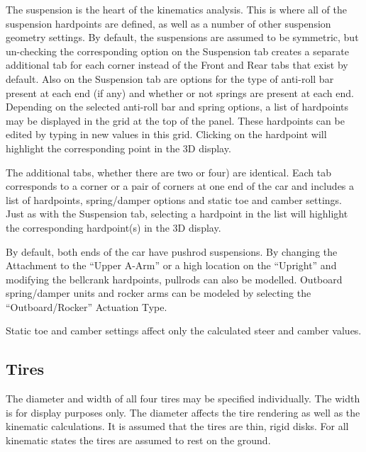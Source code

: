 The suspension is the heart of the kinematics analysis.  This is where all of the suspension hardpoints are defined, as well as a number of other suspension geometry settings.  By default, the suspensions are assumed to be symmetric, but un-checking the corresponding option on the Suspension tab creates a separate additional tab for each corner instead of the Front and Rear tabs that exist by default.  Also on the Suspension tab are options for the type of anti-roll bar present at each end (if any) and whether or not  springs are present at each end.  Depending on the selected anti-roll bar and  spring options, a list of hardpoints may be displayed in the grid at the top of the panel.  These hardpoints can be edited by typing in new values in this grid.  Clicking on the hardpoint will highlight the corresponding point in the 3D display.

The additional tabs, whether there are two or four) are identical.  Each tab corresponds to a corner or a pair of corners at one end of the car and includes a list of hardpoints, spring/damper options and static toe and camber settings.  Just as with the Suspension tab, selecting a hardpoint in the list will highlight the corresponding hardpoint(s) in the 3D display.

By default, both ends of the car have pushrod suspensions.  By changing the Attachment to the ``Upper A-Arm'' or a high location on the ``Upright'' and modifying the bellcrank hardpoints, pullrods can also be modelled.  Outboard spring/damper units and rocker arms can be modeled by selecting the ``Outboard/Rocker'' Actuation Type.

Static toe and camber settings affect only the calculated steer and camber values.

\subsection{Tires} \label{ssec:tires}

The diameter and width of all four tires may be specified individually.  The width is for display purposes only.  The diameter affects the tire rendering as well as the kinematic calculations.  It is assumed that the tires are thin, rigid disks.  For all kinematic states the tires are assumed to rest on the ground.
